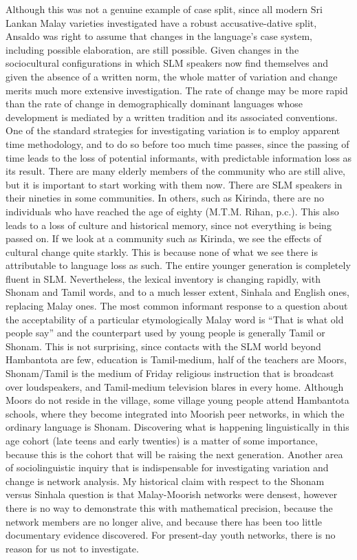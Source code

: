 Although this was not a genuine example of case split, since all modern Sri Lankan Malay varieties investigated have a robust accusative-dative split, Ansaldo was right to assume that changes in the language's case system, including possible elaboration, are still possible. Given changes in the sociocultural configurations in which SLM speakers now find themselves and given the absence of a written norm, the whole matter of variation and change merits much more extensive investigation. The rate of change may be more rapid than the rate of change in demographically dominant languages whose development is mediated by a written tradition and its associated conventions.  One of the standard strategies for investigating variation is to employ apparent time methodology, and to do so before too much time passes, since the passing of time leads to the loss of potential informants, with predictable information loss as its result. There are many elderly members of the community who are still alive, but it is important to start working with them now. There are SLM speakers in their nineties in some communities. In others, such as Kirinda, there are no individuals who have reached the age of eighty (M.T.M. Rihan, p.c.). This also leads to a loss of culture and historical memory, since not everything is being passed on. If we look at a community such as Kirinda, we see the effects of cultural change quite starkly. This is because none of what we see there is attributable to language loss as such. The entire younger generation is completely fluent in SLM. Nevertheless, the lexical inventory is changing rapidly, with Shonam and Tamil words, and to a much lesser extent, Sinhala and English ones, replacing Malay ones. The most common informant response to a question about the acceptability of a particular etymologically Malay word is ``That is what old people say'' and the counterpart used by young people is generally Tamil or Shonam. This is not surprising, since contacts with the SLM world beyond Hambantota are few, education is Tamil-medium, half of the teachers are Moors, Shonam/Tamil is the medium of Friday religious instruction that is broadcast over loudspeakers, and Tamil-medium television blares in every home. Although Moors do not reside in the village, some village young people attend Hambantota schools, where they become integrated into Moorish peer networks, in which the ordinary language is Shonam. Discovering what is happening linguistically in this age cohort (late teens and early twenties) is a matter of some importance, because this is the cohort that will be raising the next generation. Another area of sociolinguistic inquiry that is indispensable for investigating variation and change is network analysis. My historical claim with respect to the Shonam versus Sinhala question is that Malay-Moorish networks were densest, however there is no way to demonstrate this with mathematical precision, because the network members are no longer alive, and because there has been too little documentary evidence discovered. For present-day youth networks, there is no reason for us not to investigate.

